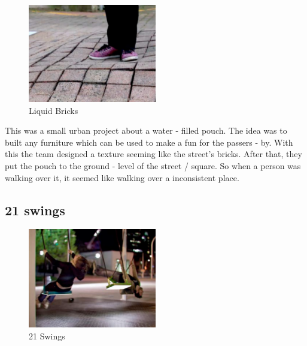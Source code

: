\begin{figure}[h!]
	\centering
	\includegraphics[width=0.5\textwidth, clip=true, keepaspectratio=true]{./pic/liquid_bricks.png}
	\caption{Liquid Bricks}
	\label{fig:liquid_bricks}
\end{figure}
 
This was a small urban project about a water - filled pouch. \newline
The idea was to built any furniture which can be used to make a fun for the passers - by. With this the team designed a texture seeming like the street's bricks. After that, they put the pouch to the ground - level of the street / square. So when a person was walking over it, it seemed like walking over a inconsistent place.\newline
{}\newline

\subsection{21 swings}

\begin{figure}[h!]
	\centering
	\includegraphics[width=0.5\textwidth, clip=true, keepaspectratio=true]{./pic/21_swings.png}
	\caption{21 Swings}
	\label{fig:21_swings}
\end{figure}

